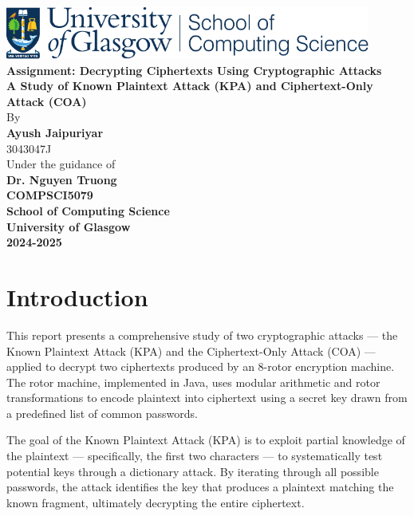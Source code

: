 \documentclass{article}
\begin{document}
\begin{titlepage}
    \begin{center}
        \Large
        \includegraphics[width=0.9\textwidth]{CompSci_colour.pdf}\\[2cm]
        \textbf{Assignment: Decrypting Ciphertexts Using Cryptographic Attacks}\\
        \textbf{A Study of Known Plaintext Attack (KPA) and Ciphertext-Only Attack (COA)}\\[2cm]
        \vfill
        By\\
        \Large
        \textbf{Ayush Jaipuriyar}\\
        3043047J\\
        \vspace{0.5cm}
        Under the guidance of \\
        \Large
        \textbf{Dr. Nguyen Truong}\\
        \vfill
        \large
        \textbf{COMPSCI5079}\\
        \textbf{School of Computing Science}\\
        \textbf{University of Glasgow}\\
        \large
        \textbf{2024-2025}
    \end{center}
\end{titlepage}

\newpage

\tableofcontents
\newpage

\section{Introduction}
This report presents a comprehensive study of two cryptographic attacks — the Known Plaintext Attack (KPA) and the Ciphertext-Only Attack (COA) — applied to decrypt two ciphertexts produced by an 8-rotor encryption machine. The rotor machine, implemented in Java, uses modular arithmetic and rotor transformations to encode plaintext into ciphertext using a secret key drawn from a predefined list of common passwords. 

The goal of the Known Plaintext Attack (KPA) is to exploit partial knowledge of the plaintext — specifically, the first two characters — to systematically test potential keys through a dictionary attack. By iterating through all possible passwords, the attack identifies the key that produces a plaintext matching the known fragment, ultimately decrypting the entire ciphertext. 
\end{document}

